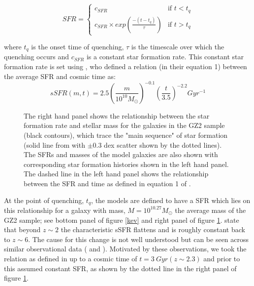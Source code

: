 \documentclass{mn2e}
\begin{document}
\[
SFR = 
\begin{cases}
c_{SFR} & \text{if } t < t_{q} \\
c_{SFR} \times exp{\left( \frac{-(t-t_{q})}{\tau}\right)} & \text{if } t > t_{q}
\end{cases}
\]

where $t_{q}$ is the onset time of quenching, $\tau$ is the timescale over which the quenching occurs and $c_{SFR}$ is a constant star formation rate. This constant star formation rate is set using \citet{Peng}, who defined a relation (in their equation 1) between the average SFR and cosmic time as:
\begin{equation*}
sSFR(m,t) = 2.5 \left( \frac{m}{10^{10} M_{\odot}} \right)^{-0.1} \left(\frac{t}{3.5}\right)^{-2.2} Gyr^{-1}
\end{equation*}

\begin{figure}
\caption{The right hand panel shows the relationship between the star formation rate and stellar mass for the galaxies in the GZ2 sample (black contours), which trace the "main sequence" of star formation (solid line from \cite{Peng} with $\pm0.3$ dex scatter shown by the dotted lines). The SFRs and masses of the model galaxies are also shown with corresponding star formation histories shown in the left hand panel. The dashed line in the left hand panel shows the relationship between the SFR and time as defined in equation 1 of \citet{Peng}.}
\label{sfr_mass}
\end{figure}


At the point of quenching, $t_{q}$, the models are defined to have a SFR which lies on this relationship for a galaxy with mass, $M = 10^{10.27} M_{\odot}$ the average mass of the GZ2 sample; see bottom panel of figure \ref{kev} and right panel of figure \ref{sfr_mass}. \citet{Peng} state that beyond $z \sim 2$ the characteristic sSFR flattens and is roughly constant back to $z\sim6$. The cause for this change is not well understood but can be seen across similar observational data (\cite{Gonzalez} and \cite{Beth}). Motivated by these observations, we took the relation as defined in \citet{Peng} up to a cosmic time of $t=3~Gyr (z \sim 2.3)$ and prior to this assumed constant SFR, as shown by the dotted line in the right panel of figure \ref{sfr_mass}.
 
\end{document}
